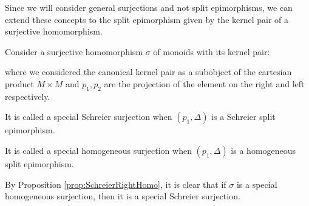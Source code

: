 Since we will consider general surjections and not split epimorphisms, we can extend these concepts to the split epimorphism given by the kernel pair of a surjective homomorphism.
\begin{definition}
    Consider a surjective homomorphism $\sigma$ of monoids with its kernel pair:
    \begin{center}
    \end{center}
    where we considered the canonical kernel pair as a subobject of the cartesian product $M\times M$ and $p_1, p_2$ are the projection of the element on the right and left respectively.
    
    It is called a special Schreier surjection when $(p_1,\Delta)$ is a Schreier split epimorphism.

    It is called a special homogeneous surjection when $(p_1,\Delta)$ is a homogeneous split epimorphism.
\end{definition}
\begin{oss*}
    By Proposition \ref{prop:SchreierRightHomo}, it is clear that if $\sigma$ is a special homogeneous surjection, then it is a special Schreier surjection.
\end{oss*}

